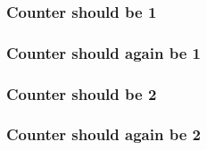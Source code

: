 \documentclass{beamer}
\begin{document}
\begin{frame}
\frametitle<1>{Counter should be 1}
\frametitle<2>{Counter should again be 1}
\end{frame}

\begin{frame}
\frametitle<1>{Counter should be 2}
\frametitle<2>{Counter should again be 2}
\end{frame}
\end{document}
